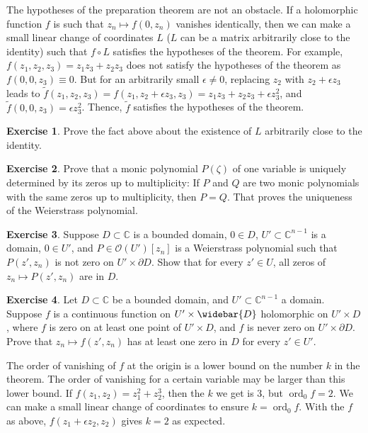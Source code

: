 \documentclass[12pt,openany]{book}
\newcommand{\ord}{\operatorname{ord}}
\newcommand{\C}{{\mathbb{C}}}
\newcommand{\sO}{{\mathscr{O}}}
\theoremstyle{plain}
\theoremstyle{remark}
\theoremstyle{definition}
\newenvironment{exbox}{%
    \def\FrameCommand{\vrule width 1pt \relax\hspace{10pt}}%
    \MakeFramed{\advance\hsize-\width\FrameRestore}%
}{%
    \endMakeFramed
}
\theoremstyle{exercise}
\newtheorem{exercise}{Exercise}[section]
\theoremstyle{example}
\begin{document}
The hypotheses of the preparation theorem are not an obstacle.  If a holomorphic
function $f$ is such that $z_n \mapsto f(0,z_n)$ vanishes identically,
then we can make a small linear change of
coordinates $L$ ($L$ can be a matrix arbitrarily close to the identity) such
that $f \circ L$ satisfies the hypotheses of the theorem.
For example, $f(z_1,z_2,z_3) = z_1z_3+z_2z_3$ does not satisfy the
hypotheses of the theorem as $f(0,0,z_3) \equiv 0$.  But for an arbitrarily
small $\epsilon \not= 0$, replacing
$z_2$ with $z_2 + \epsilon z_3$ leads to $\tilde{f}(z_1,z_2,z_3)
= f(z_1,z_2+\epsilon z_3,z_3) =
z_1z_3+z_2z_3 + \epsilon z_3^2$, and $\tilde{f}(0,0,z_3) = \epsilon z_3^2$.
Thence, $\tilde{f}$
satisfies the hypotheses of the theorem.

\begin{exbox}
\begin{exercise}
Prove the fact above about the existence of $L$ arbitrarily close to the
identity.
\end{exercise}

\begin{exercise} \label{exercise:monicpolyunique}
Prove that a monic polynomial $P(\zeta)$ of one variable is
uniquely determined by its zeros up to multiplicity:
If $P$ and $Q$ are two monic polynomials with the same zeros
up to multiplicity,
then $P=Q$.  That proves the uniqueness of the Weierstrass polynomial.
\end{exercise}

\begin{exercise}
Suppose $D \subset \C$ is a bounded domain, $0 \in D$,
$U' \subset \C^{n-1}$ is a domain, $0 \in U'$,
and $P \in \sO(U')[z_n]$ is a Weierstrass polynomial
such that $P(z',z_n)$ is not zero on $U' \times \partial D$.
Show that for every $z' \in U$, all zeros of $z_n \mapsto P(z',z_n)$ are in $D$.
\end{exercise}

\begin{exercise}
Let $D \subset \C$ be a bounded domain,
and
$U' \subset \C^{n-1}$ a domain.
Suppose
$f$ is a continuous function on
$U' \times \widebar{D}$ holomorphic on $U' \times D$,
where $f$ is zero on at least one point
of $U' \times D$, and $f$ is never zero on
$U' \times \partial D$.
Prove that
$z_n \mapsto f(z',z_n)$ has at least one zero in $D$ for every $z' \in U'$.
\end{exercise}
\end{exbox}

\pagebreak[2]
The order of vanishing of $f$ at the origin is a lower bound
on the number $k$ in the theorem.  The order of vanishing for a certain
variable may be larger than this lower bound.  If $f(z_1,z_2) =
z_1^2 + z_2^3$, then the $k$ we get is $3$, but $\ord_0 f = 2$.
We can make a small
linear change of coordinates to ensure $k = \ord_0 f$.
With the $f$ as above, $f(z_1 + \epsilon z_2,z_2)$ gives $k = 2$
as expected.
\end{document}
